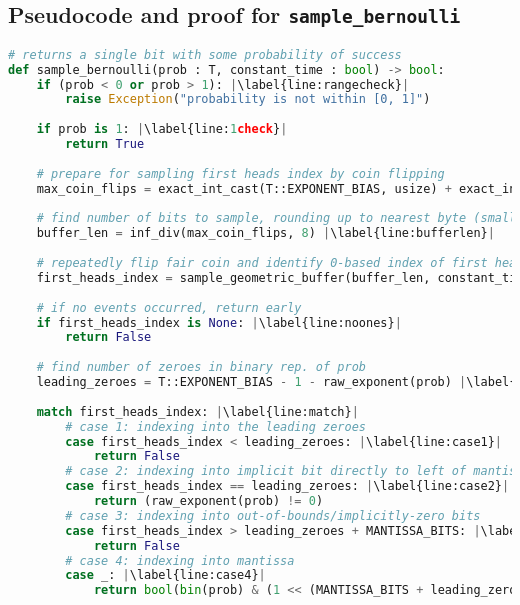 \documentclass[11pt,a4paper]{article}
\theoremstyle{definition}
\begin{document}
\subsection{Pseudocode and proof for \texttt{sample\_bernoulli}}

\begin{lstlisting}[language=Python, escapechar=|]
# returns a single bit with some probability of success
def sample_bernoulli(prob : T, constant_time : bool) -> bool:
    if (prob < 0 or prob > 1): |\label{line:rangecheck}|
        raise Exception("probability is not within [0, 1]")
        
    if prob is 1: |\label{line:1check}|
        return True
        
    # prepare for sampling first heads index by coin flipping
    max_coin_flips = exact_int_cast(T::EXPONENT_BIAS, usize) + exact_int_cast(T::MANTISSA_BITS) |\label{line:maxcoinflips}|
    
    # find number of bits to sample, rounding up to nearest byte (smallest sample size)
    buffer_len = inf_div(max_coin_flips, 8) |\label{line:bufferlen}|
    
    # repeatedly flip fair coin and identify 0-based index of first heads
    first_heads_index = sample_geometric_buffer(buffer_len, constant_time) |\label{line:sampling}|
    
    # if no events occurred, return early
    if first_heads_index is None: |\label{line:noones}|
        return False
    
    # find number of zeroes in binary rep. of prob
    leading_zeroes = T::EXPONENT_BIAS - 1 - raw_exponent(prob) |\label{line:leadingzeroes}|
    
    match first_heads_index: |\label{line:match}|
        # case 1: indexing into the leading zeroes
        case first_heads_index < leading_zeroes: |\label{line:case1}|
            return False
        # case 2: indexing into implicit bit directly to left of mantissa
        case first_heads_index == leading_zeroes: |\label{line:case2}|
            return (raw_exponent(prob) != 0)
        # case 3: indexing into out-of-bounds/implicitly-zero bits
        case first_heads_index > leading_zeroes + MANTISSA_BITS: |\label{line:case3}|
            return False
        # case 4: indexing into mantissa
        case _: |\label{line:case4}|
            return bool(bin(prob) & (1 << (MANTISSA_BITS + leading_zeroes - first_heads_index)))

\end{lstlisting}
\end{document}
